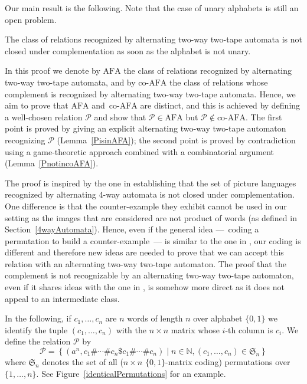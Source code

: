 \documentclass[runningheads, envcountsame, a4paper]{llncs}
\newcommand*{\N}{\mathbb{N}}
\newcommand*{\perm}{\mathcal{P}}
\newcommand*{\permutations}[1]{\mathfrak{S}_{#1}}
\newcommand*{\colsep}{\#}
\newcommand*{\separator}{\$}
\newcommand*{\AFA}{\mathrm{AFA}}
\newcommand*{\coAFA}{\mathrm{co}$-$\mathrm{AFA}}
\newcommand*{\some}{a}
\newcommand*{\amodel}{alternating two-way two-tape automaton\xspace}
\newcommand*{\amodels}{alternating two-way two-tape automata\xspace}
\begin{document}
Our main result is the following. Note that the case of unary alphabets is
still an open problem.

\begin{theorem} \label{AFAcompl}
  The class of relations recognized by \amodels is not closed under
  complementation as soon as the alphabet is not unary.
\end{theorem}

In this proof we denote by $\AFA$ the class of relations recognized by
\amodels, and by $\coAFA$ the class of relations whose complement is
recognized by \amodels. Hence, we aim to prove that $\AFA$ and~$\coAFA$
are distinct, and this is achieved by defining a well-chosen relation
$\perm$ and show that $\perm\in \AFA$ but $\perm\notin \coAFA$. The first
point is proved by giving an explicit \amodel recognizing $\perm$
(Lemma~\ref{PisinAFA}); the second point is proved by contradiction using a
game-theoretic approach combined with a combinatorial argument
(Lemma~\ref{PnotincoAFA}).

The proof is inspired by the one in \cite{KariMoore01} establishing that
the set of picture languages recognized by alternating 4-way automata is
not closed under complementation. One difference is that the
counter-example they exhibit cannot be used in our setting as the images
that are considered are not product of words (as defined in
Section~\ref{4wayAutomata}). Hence, even if the general idea ---~coding a
permutation to build a counter-example~--- is similar to the one in
\cite{KariMoore01}, our coding is different and therefore new ideas are
needed to prove that we can accept this relation with an \amodel. The proof
that the complement is not recognizable by an \amodel, even if it shares
ideas with the one in \cite{KariMoore01}, is somehow more direct as it does
not appeal to an intermediate class.

In the following, if $c_1, \dots, c_n$ are $n$ words of length $n$ over
alphabet $\{0,1\}$ we identify the tuple $(c_1,\dots,c_n)$ with the
$n\times n$ matrix whose $i$-th column is $c_i$. We define the relation
$\perm$ by $$\perm = \left\{(\some^n, c_1 \colsep \cdots \colsep c_n
  \separator c_1 \colsep \cdots \colsep c_n) \mid n \in \N, (c_1, \dots,
  c_n) \in \permutations{n} \right\}$$
where $\permutations{n}$ denotes the
set of all ($n\times n$ $\{0,1\}$-matrix coding) permutations over $\{1,
\dots, n\}$. See Figure~\ref{identicalPermutations} for an example.
\end{document}
